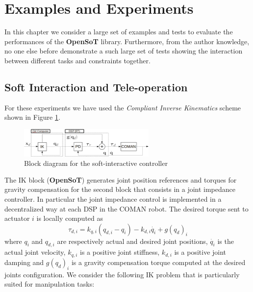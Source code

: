 \section{Examples and Experiments}
\label{sec:examples}
In this chapter we consider a large set of examples and tests to evaluate the performances of the \textbf{OpenSoT} library. Furthermore, from the author knowledge, no one else before demonstrate a such large set of tests showing the interaction between different tasks and constraints together.

\subsection{Soft Interaction and Tele-operation}
For these experiments we have used the \emph{Compliant Inverse Kinematics} scheme shown in Figure \ref{soft_interaction_block_diagram}.
\begin{figure}[!h]
\vspace{2 mm}
\centering
\includegraphics[width=0.6\textwidth]{images/soft_interaction/ctrl_scheme.eps}
\caption{Block diagram for the soft-interactive controller}
\label{soft_interaction_block_diagram}
\end{figure}
The IK block (\textbf{OpenSoT}) generates joint position references and torques for gravity compensation for the second block that consists in a joint impedance controller. In particular the joint impedance control is implemented in a decentralized way at each DSP in the COMAN robot. The desired torque sent to actuator $i$ is locally computed as
\begin{equation}
    \tau_{d,i} = k_{q,i} (q_{d,i} - q_i) -k_{d,i}\dot{q_i} + g(q_d)_i
    \label{joint_impedance_control}
\end{equation}
where $q_i$ and $q_{d,i}$ are respectively actual and desired joint positions, $\dot{q_i}$ is the  actual joint velocity, $k_{q,i}$ is a positive joint stiffness, $k_{d,i}$ is a positive joint damping and $g(q_d)_i$ is a gravity compensation torque computed at the desired joints configuration.
We consider the following IK problem that is particularly suited for manipulation tasks:

